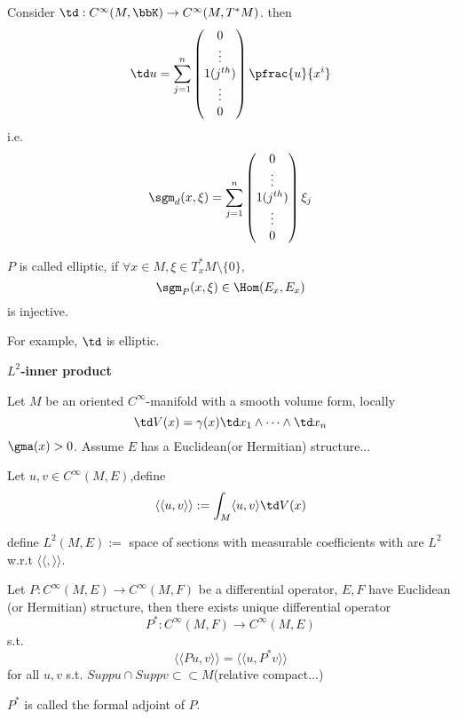 \begin{example}
Consider $\td: C^\infty(M,\bbK)\to C^{\infty}(M,T^*M)$.
then
$$\td u=
\sum_{j=1}^n
\begin{pmatrix}
0\\
\vdots\\
1(j^{th})\\
\vdots\\
0
\end{pmatrix}
\pfrac{u}{x^i}$$
i.e.
$$\sgm_d(x,\xi)
=\sum_{j=1}^n
\begin{pmatrix}
0\\
\vdots\\
1(j^{th})\\
\vdots\\
0
\end{pmatrix}\xi_j$$
\end{example}
\begin{definition}
$P$ is called elliptic, if $\forall x\in M,\xi\in T^*_xM\setminus\{0\}$,
$$\sgm_P(x,\xi)\in \Hom(E_x,E_x)$$
is injective.
\end{definition}
For example, $\td$ is elliptic.

\textbf{$L^2$-inner product}

Let $M$ be an oriented $C^\infty$-manifold with a smooth volume form, locally
$$\td V(x)=\gamma(x)\td x_1\wedge\cdots\wedge\td x_n$$
$\gma(x)>0$. Assume $E$ has a Euclidean(or Hermitian) structure...

Let $u,v\in C^{\infty}(M,E)$,define
$$\langle\langle u,v \rangle\rangle:=
\int_M\langle u , v \rangle\td V(x)$$

define $L^2(M,E):=$ space of sections with measurable coefficients with are $L^2$ w.r.t
$\langle\langle,\rangle\rangle$.

\begin{definition}
Let $P:C^\infty(M,E)\to C^\infty(M,F)$ be a differential operator,
$E,F$ have Euclidean (or Hermitian) structure, then there exists unique
differential operator
$$P^*:C^{\infty}(M,F)\to C^\infty(M,E)$$
s.t.
$$\langle\langle Pu,v\rangle\rangle=\langle\langle u,P^*v\rangle\rangle$$
for all $u,v$ s.t. $Supp u\cap Supp v\subset\subset M$(relative compact...)

$P^*$ is called the formal adjoint of $P$.
\end{definition}

